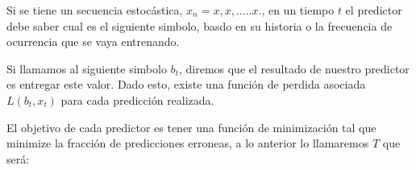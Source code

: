 


Si se tiene un secuencia estocástica, $x_{n} = x , x ,.....x .  $, en un tiempo $t$ el predictor debe saber cual es el siguiente simbolo, basdo en su historia o la frecuencia de ocurrencia que se vaya entrenando.

Si llamamos al siguiente simbolo $b_{t}$, diremos que el resultado de nuestro predictor es entregar este valor. Dado esto, existe una función de perdida asociada $L( b_{t},x_{t} )$ para cada predicción realizada. 

El objetivo de cada predictor es tener una función de minimización tal que minimize la fracción de predicciones erroneas, a lo anterior lo llamaremos $T$ que será:

